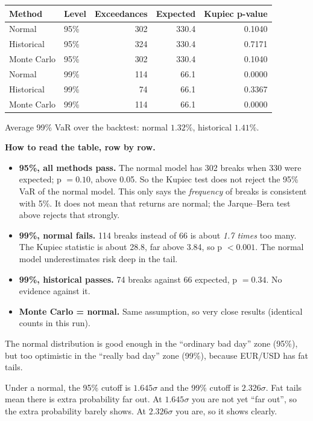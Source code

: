 \documentclass[11pt,a4paper]{article}
\begin{document}
\begin{center}
\begin{tabular}{llrrr}
\toprule
Method & Level & Exceedances & Expected & Kupiec p-value \\
\midrule
Normal         & 95\% & 302 & 330.4 & 0.1040 \\
Historical     & 95\% & 324 & 330.4 & 0.7171 \\
Monte Carlo    & 95\% & 302 & 330.4 & 0.1040 \\
\midrule
Normal         & 99\% & 114 & 66.1 & 0.0000 \\
Historical     & 99\% &  74 & 66.1 & 0.3367 \\
Monte Carlo    & 99\% & 114 & 66.1 & 0.0000 \\
\bottomrule
\end{tabular}
\end{center}

Average 99\% VaR over the backtest: normal $1.32\%$, historical $1.41\%$.

\textbf{How to read the table, row by row.}
\begin{itemize}
  \item \textbf{95\%, all methods pass.} The normal model has 302 breaks
    when 330 were expected; p $= 0.10$, above 0.05. So the Kupiec test does
    not reject the 95\% VaR of the normal model. This only says the
    \emph{frequency} of breaks is consistent with 5\%. It does not mean that
    returns are normal; the Jarque--Bera test above rejects that strongly.
  \item \textbf{99\%, normal fails.} 114 breaks instead of 66 is about
    \emph{1.7 times} too many. The Kupiec statistic is about 28.8, far above
    3.84, so p $< 0.001$. The normal model underestimates risk deep in the
    tail.
  \item \textbf{99\%, historical passes.} 74 breaks against 66 expected,
    p $= 0.34$. No evidence against it.
  \item \textbf{Monte Carlo = normal.} Same assumption, so very close results (identical counts in this run).
\end{itemize}

\begin{onesentence}
The normal distribution is good enough in the ``ordinary bad day'' zone
(95\%), but too optimistic in the ``really bad day'' zone (99\%), because
EUR/USD has fat tails.
\end{onesentence}

\begin{example}
Under a normal, the 95\% cutoff is $1.645\sigma$ and the 99\% cutoff is
$2.326\sigma$. Fat tails mean there is extra probability far out. At
$1.645\sigma$ you are not yet ``far out'', so the extra probability
barely shows. At $2.326\sigma$ you are, so it shows clearly.
\end{example}
\end{document}
